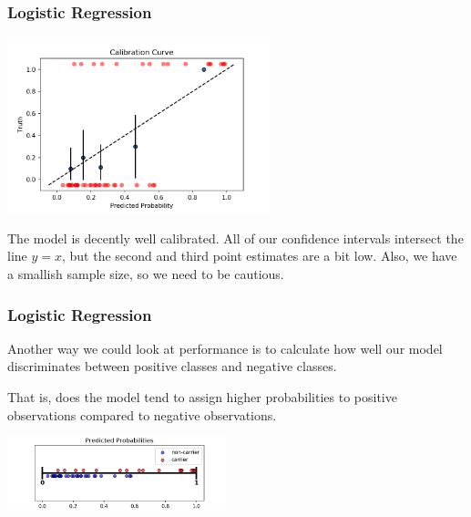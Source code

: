 \documentclass[11pt, table]{beamer}
\begin{document}
\begin{frame}
\frametitle{Logistic Regression}
\begin{center}
	\includegraphics[width=3in]{images/Dystrophy/calib_01.png}
\end{center}

The model is decently well calibrated. All of our confidence intervals intersect the line $y=x$, but the second and third point estimates are a bit low. Also, we have a smallish sample size, so we need to be cautious. 
\end{frame}

\begin{frame}
\frametitle{Logistic Regression}
Another way we could look at performance is to calculate how well our model discriminates between positive classes and negative classes. 
\vspace{0.1in}

That is, does the model tend to assign higher probabilities to positive observations compared to negative observations. 
\vspace{0.1in}

\begin{center}
	\includegraphics[width = 2.5in]{images/Dystrophy/pred_proba_01.png}
\end{center}
\end{frame}
\end{document}
